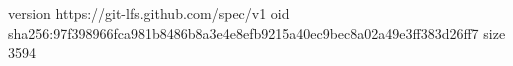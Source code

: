 version https://git-lfs.github.com/spec/v1
oid sha256:97f398966fca981b8486b8a3e4e8efb9215a40ec9bec8a02a49e3ff383d26ff7
size 3594
